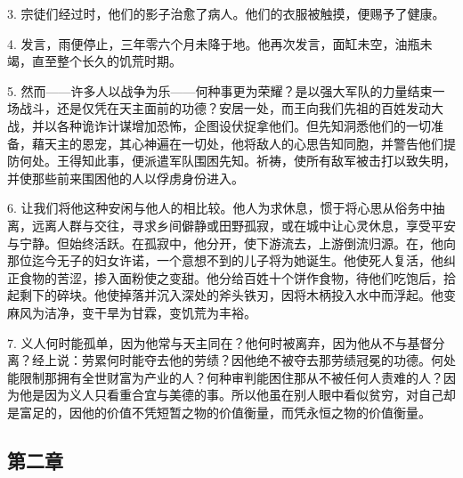 3. 宗徒们经过时，他们的影子治愈了病人。他们的衣服被触摸，便赐予了健康。\par

4. 发言，雨便停止，三年零六个月未降于地。他再次发言，面缸未空，油瓶未竭，直至整个长久的饥荒时期。\par

5. 然而——许多人以战争为乐——何种事更为荣耀？是以强大军队的力量结束一场战斗，还是仅凭在天主面前的功德？安居一处，而王向我们先祖的百姓发动大战，并以各种诡诈计谋增加恐怖，企图设伏捉拿他们。但先知洞悉他们的一切准备，藉天主的恩宠，其心神遍在一切处，他将敌人的心思告知同胞，并警告他们提防何处。王得知此事，便派遣军队围困先知。祈祷，使所有敌军被击打以致失明，并使那些前来围困他的人以俘虏身份进入。\par

6. 让我们将他这种安闲与他人的相比较。他人为求休息，惯于将心思从俗务中抽离，远离人群与交往，寻求乡间僻静或田野孤寂，或在城中让心灵休息，享受平安与宁静。但始终活跃。在孤寂中，他分开，使下游流去，上游倒流归源。在，他向那位迄今无子的妇女许诺，一个意想不到的儿子将为她诞生。他使死人复活，他纠正食物的苦涩，掺入面粉使之变甜。他分给百姓十个饼作食物，待他们吃饱后，拾起剩下的碎块。他使掉落并沉入深处的斧头铁刃，因将木柄投入水中而浮起。他变麻风为洁净，变干旱为甘霖，变饥荒为丰裕。\par

7. 义人何时能孤单，因为他常与天主同在？他何时被离弃，因为他从不与基督分离？经上说：劳累何时能夺去他的劳绩？因他绝不被夺去那劳绩冠冕的功德。何处能限制那拥有全世财富为产业的人？何种审判能困住那从不被任何人责难的人？因为他是因为义人只看重合宜与美德的事。所以他虽在别人眼中看似贫穷，对自己却是富足的，因他的价值不凭短暂之物的价值衡量，而凭永恒之物的价值衡量。\par


\subsection{第二章}

\par

